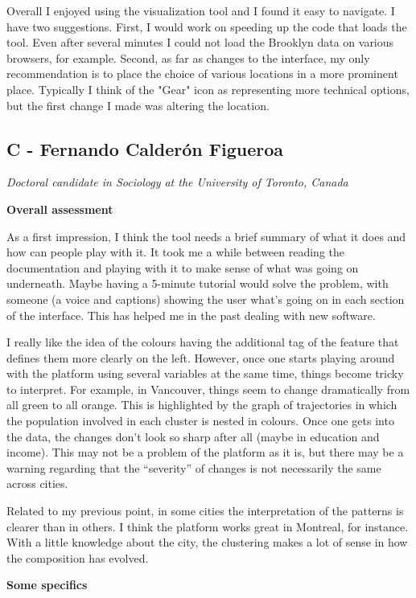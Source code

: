 \documentclass[a4paper]{article}
\begin{document}
Overall I enjoyed using the visualization tool and I found it easy to navigate.
I have two suggestions. First, I would work on speeding up the code that loads
the tool. Even after several minutes I could not load the Brooklyn data on
various browsers, for example. Second, as far as changes to the interface, my
only recommendation is to place the choice of various locations in a more
prominent place. Typically I think of the "Gear" icon as representing more
technical options, but the first change I made was altering the location.

\subsection{C - Fernando Calderón Figueroa}
\emph{Doctoral candidate in Sociology at the University of Toronto, Canada}


\textbf{Overall assessment}

As a first impression, I think the tool needs a brief summary of what it does
and how can people play with it. It took me a while between reading the
documentation and playing with it to make sense of what was going on underneath.
Maybe having a 5-minute tutorial would solve the problem, with someone (a voice
and captions) showing the user what’s going on in each section of the interface.
This has helped me in the past dealing with new software.

I really like the idea of the colours having the additional tag of the feature
that defines them more clearly on the left. However, once one starts playing
around with the platform using several variables at the same time, things become
tricky to interpret. For example, in Vancouver, things seem to change
dramatically from all green to all orange. This is highlighted by the graph of
trajectories in which the population involved in each cluster is nested in
colours. Once one gets into the data, the changes don't look so sharp after all
(maybe in education and income). This may not be a problem of the platform as it
is, but there may be a warning regarding that the “severity” of changes is not
necessarily the same across cities. 

Related to my previous point, in some cities the interpretation of the patterns
is clearer than in others. I think the platform works great in Montreal, for
instance. With a little knowledge about the city, the clustering makes a lot of
sense in how the composition has evolved. 

\textbf{Some specifics}
\end{document}
